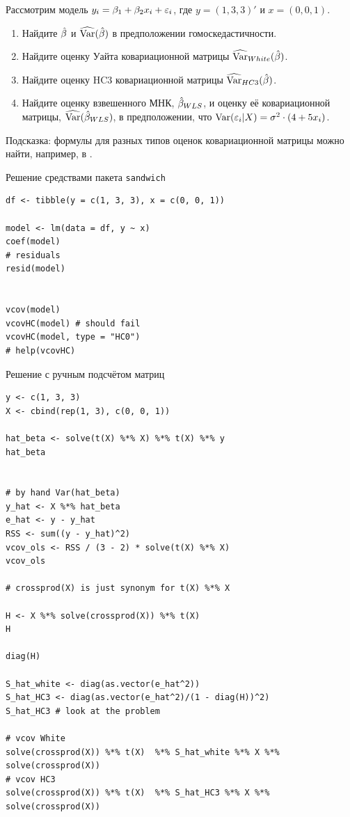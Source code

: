 \begin{problem}
Рассмотрим модель $y_i=\beta_1 + \beta_2 x_i + \varepsilon_i$, где $y=(1,3,3)'$ и $x=(0,0,1)$.
\begin{enumerate}
\item Найдите $\hat{\beta}$ и $\widehat{\operatorname{Var}}(\hat{\beta})$ в предположении гомоскедастичности.
\item Найдите оценку Уайта ковариационной матрицы $\widehat{\operatorname{Var}}_{White}(\hat{\beta})$.
\item Найдите оценку HC3 ковариационной матрицы $\widehat{\operatorname{Var}}_{HC3}(\hat{\beta})$.
\item Найдите оценку взвешенного МНК, $\hat{\beta}_{WLS}$, и оценку её ковариационной матрицы, $\widehat{\operatorname{Var}}(\hat{\beta}_{WLS})$, в предположении, что $\operatorname{Var}(\varepsilon_i|X)=\sigma^2 \cdot ( 4 + 5x_i)$.
\end{enumerate}

Подсказка: формулы для разных типов оценок ковариационной матрицы можно найти, например, в \cite{zeileis2004econometric}.

\begin{sol}
Решение средствами пакета \verb|sandwich|
\begin{verbatim}
df <- tibble(y = c(1, 3, 3), x = c(0, 0, 1))

model <- lm(data = df, y ~ x)
coef(model)
# residuals
resid(model)


vcov(model)
vcovHC(model) # should fail
vcovHC(model, type = "HC0")
# help(vcovHC)
\end{verbatim}

Решение с ручным подсчётом матриц
\begin{verbatim}
y <- c(1, 3, 3)
X <- cbind(rep(1, 3), c(0, 0, 1))

hat_beta <- solve(t(X) %*% X) %*% t(X) %*% y
hat_beta


# by hand Var(hat_beta)
y_hat <- X %*% hat_beta
e_hat <- y - y_hat
RSS <- sum((y - y_hat)^2)
vcov_ols <- RSS / (3 - 2) * solve(t(X) %*% X)
vcov_ols

# crossprod(X) is just synonym for t(X) %*% X

H <- X %*% solve(crossprod(X)) %*% t(X)
H

diag(H)

S_hat_white <- diag(as.vector(e_hat^2))
S_hat_HC3 <- diag(as.vector(e_hat^2)/(1 - diag(H))^2)
S_hat_HC3 # look at the problem

# vcov White
solve(crossprod(X)) %*% t(X)  %*% S_hat_white %*% X %*% solve(crossprod(X))
# vcov HC3
solve(crossprod(X)) %*% t(X)  %*% S_hat_HC3 %*% X %*% solve(crossprod(X))
\end{verbatim}

\end{sol}
\end{problem}



